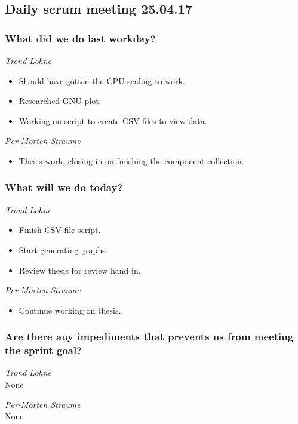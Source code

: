 \documentclass{article}
\begin{document}
\begin{center}
\subsection*{Daily scrum meeting 25.04.17}
\end{center}
\bigskip


\subsubsection*{What did we do last workday?}

\noindent\textit{Trond Lohne}
\begin{itemize}
	\item
	Should have gotten the CPU scaling to work.

	\item
	Researched GNU plot.

	\item
	Working on script to create CSV files to view data.
\end{itemize}

\medskip

\noindent\textit{Per-Morten Straume}
\begin{itemize}
	\item
	Thesis work, closing in on finishing the component collection.
\end{itemize}


\subsubsection*{What will we do today?}

\noindent\textit{Trond Lohne}
\begin{itemize}
	\item
	Finish CSV file script.

	\item
	Start generating graphs.

    \item
    Review thesis for review hand in.
\end{itemize}

\medskip

\noindent\textit{Per-Morten Straume}
\begin{itemize}
	\item
	Continue working on thesis.
\end{itemize}


\subsubsection*{Are there any impediments that prevents us from meeting the sprint goal?}

\noindent\textit{Trond Lohne}\\
None

\medskip

\noindent\textit{Per-Morten Straume}\\
None
\end{document}

